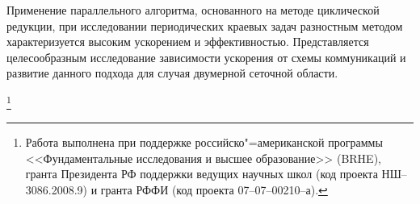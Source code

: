 
Применение параллельного алгоритма, основанного на методе циклической редукции, при исследовании периодических краевых задач разностным методом характеризуется высоким ускорением и эффективностью. Представляется целесообразным исследование зависимости ускорения от схемы коммуникаций и развитие данного подхода для случая двумерной сеточной области.



\thanks {Работа выполнена при поддержке российско"=американской программы <<Фундаментальные исследования и высшее образование>> {\rm(}BRHE{\rm ),} гранта Президента РФ поддержки ведущих научных школ {\rm (}код проекта {\rm НШ--3086.2008.9)} и гранта РФФИ {\rm(}код проекта {\rm07--07--00210--а).}}








